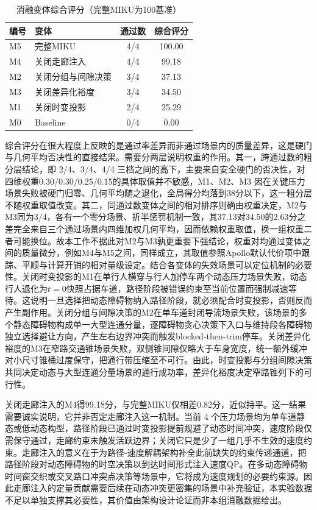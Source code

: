 \documentclass[a4paper,11pt]{ctexart}
\theoremstyle{definition}
\begin{document}
\begin{table}[htbp]
\centering
\caption{消融变体综合评分（完整MIKU为100基准）}
\label{tab:exp_ablation_score}
\small
\begin{tabular}{llcc}
\toprule
\textbf{编号} & \textbf{变体} & \textbf{通过数} & \textbf{综合评分} \\
\midrule
M5 & 完整MIKU             & 4/4 & 100.00 \\
M4 & 关闭走廊注入         & 4/4 & 99.18 \\
M2 & 关闭分组与间隙决策   & 3/4 & 37.13 \\
M3 & 关闭差异化裕度       & 3/4 & 34.50 \\
M1 & 关闭时变投影         & 2/4 & 25.29 \\
M0 & Baseline             & 0/4 & 0.00 \\
\bottomrule
\end{tabular}
\end{table}

综合评分在很大程度上反映的是通过率差异而非通过场景内的质量差异，这是硬门与几何平均否决性的直接结果。需要分两层说明权重的作用。其一，跨通过数的粗分层结论，即 2/4、3/4、4/4 三档之间的高下，主要来自安全硬门的否决性，对四维权重0.30/0.30/0.25/0.15的具体取值并不敏感，M1、M2、M3 因在关键压力场景失败被硬门归零、几何平均随之退化，全局得分均落到38分以下，这一粗分层不随权重取值改变。其二，同通过数变体之间的相对排序则确由权重决定，M2与M3同为3/4，各有一个零分场景、折半惩罚机制一致，其37.13对34.50的2.63分之差完全来自三个通过场景内四维加权几何平均，因而依赖权重取值，换一组权重二者可能换位。故本工作不据此对M2与M3孰更重要下强结论，权重对均通过变体之间的质量微分，例如M4与M5之间，同样成立，其取值参照Apollo默认代价项中跟踪、平顺与计算开销的相对量级设定。结合各变体的失效场景可以定位机制的必要性。关闭时变投影的M1在单行人横穿与行人加停车两个动态压力场景失败，动态行人退化为$t=0$快照占据车道，路径阶段被错误约束至当前位置而强制减速等待。这说明一旦选择把动态障碍物纳入路径阶段，就必须配合时变投影，否则反而产生副作用。关闭分组与间隙决策的M2在单车道封闭导流场景失败，该场景的多个静态障碍物构成单一大型连通分量，逐障碍物贪心决策下入口与维持段各障碍物独立选择避让方向，产生左右边界冲突而触发blocked-then-trim停车。关闭差异化裕度的M3在窄路交通锥场景失败，双侧锥间隙仅略大于车身宽度，统一额外缓冲对小尺寸锥桶过度保守，把通行带压缩至不可行。由此，时变投影与分组间隙决策共同决定动态与大型连通分量场景的通行成功率，差异化裕度决定窄路锥列下的可行性。

关闭走廊注入的M4得99.18分，与完整MIKU仅相差0.82分，近似持平。这一结果需要诚实说明，它并非否定走廊注入这一机制。当前 4 个压力场景均为单车道静态或低动态构型，路径阶段已通过时变投影提前规避了动态时间冲突，速度阶段仅需保守通过，走廊约束未触发活跃边界；关闭它只是少了一组几乎不生效的速度约束。走廊注入的意义在于为路径-速度解耦架构补全此前缺失的约束传递通道，把路径阶段对动态障碍物的时空决策以到达时间形式注入速度QP。在多动态障碍物时间窗交织或交叉路口冲突点决策等场景中，它将成为速度规划的必要约束源。因此走廊注入的定量贡献需要后续在动态冲突更密集的场景中补充验证，本实验数据不足以单独支撑其必要性，其价值由架构设计论证而非本组消融数据给出。
\end{document}
